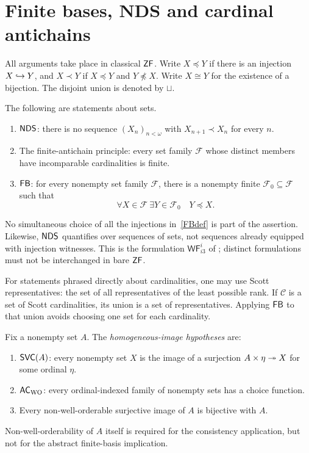 \section{Finite bases, NDS and cardinal antichains}\label{defs}

All arguments take place in classical $\mathsf{ZF}$. Write $X\preccurlyeq Y$ if there is an injection $X\hookrightarrow Y$, and $X\prec Y$ if $X\preccurlyeq Y$ and $Y\not\preccurlyeq X$. Write $X\cong Y$ for the existence of a bijection. The disjoint union is denoted by $\sqcup$.

\begin{definition}
The following are statements about sets.
\begin{enumerate}[label=(\roman*)]
\item $\mathsf{NDS}$: there is no sequence $(X_n)_{n<\omega}$ with $X_{n+1}\prec X_n$ for every $n$.
\item The finite-antichain principle: every set family $\mathcal F$ whose distinct members have incomparable cardinalities is finite.
\item $\mathsf{FB}$: for every nonempty set family $\mathcal F$, there is a nonempty finite $\mathcal F_0\subseteq\mathcal F$ such that
\begin{equation}\label{FBdef}
 \forall X\in\mathcal F\ \exists Y\in\mathcal F_0\quad Y\preccurlyeq X.
\end{equation}
\end{enumerate}
No simultaneous choice of all the injections in~\eqref{FBdef} is part of the assertion. Likewise, $\mathsf{NDS}$ quantifies over sequences of sets, not sequences already equipped with injection witnesses. This is the formulation $\mathsf{WF}_{i3}^{i}$ of \cite{BK}; distinct formulations must not be interchanged in bare $\mathsf{ZF}$.
\end{definition}

For statements phrased directly about cardinalities, one may use Scott representatives: the set of all representatives of the least possible rank. If $\mathcal C$ is a set of Scott cardinalities, its union is a set of representatives. Applying $\mathsf{FB}$ to that union avoids choosing one set for each cardinality.

\begin{definition}\label{package}
Fix a nonempty set $A$. The \emph{homogeneous-image hypotheses} are:
\begin{enumerate}[label=(\Alph*)]
\item\label{S} $\mathsf{SVC}(A)$: every nonempty set $X$ is the image of a surjection $A\times\eta\twoheadrightarrow X$ for some ordinal $\eta$.
\item\label{W} $\mathsf{AC}_{\mathrm{WO}}$: every ordinal-indexed family of nonempty sets has a choice function.
\item\label{Q} Every non-well-orderable surjective image of $A$ is bijective with $A$.
\end{enumerate}
Non-well-orderability of $A$ itself is required for the consistency application, but not for the abstract finite-basis implication.
\end{definition}

